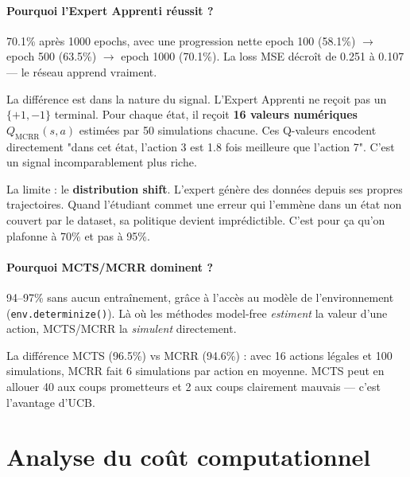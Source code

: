 \documentclass[12pt,a4paper]{article}
\begin{document}
\paragraph{Pourquoi l'Expert Apprenti réussit ?}

70.1\% après 1000 epochs, avec une progression nette epoch 100 (58.1\%) $\to$ epoch 500 (63.5\%) $\to$ epoch 1000 (70.1\%). La loss MSE décroît de 0.251 à 0.107 — le réseau apprend vraiment.

La différence est dans la nature du signal. L'Expert Apprenti ne reçoit pas un $\{+1, -1\}$ terminal. Pour chaque état, il reçoit \textbf{16 valeurs numériques} $Q_\text{MCRR}(s, a)$ estimées par 50 simulations chacune. Ces Q-valeurs encodent directement "dans cet état, l'action 3 est 1.8 fois meilleure que l'action 7". C'est un signal incomparablement plus riche.

La limite : le \textbf{distribution shift}. L'expert génère des données depuis ses propres trajectoires. Quand l'étudiant commet une erreur qui l'emmène dans un état non couvert par le dataset, sa politique devient imprédictible. C'est pour ça qu'on plafonne à 70\% et pas à 95\%.

\paragraph{Pourquoi MCTS/MCRR dominent ?}

94--97\% sans aucun entraînement, grâce à l'accès au modèle de l'environnement (\texttt{env.determinize()}). Là où les méthodes model-free \emph{estiment} la valeur d'une action, MCTS/MCRR la \emph{simulent} directement.

La différence MCTS (96.5\%) vs MCRR (94.6\%) : avec 16 actions légales et 100 simulations, MCRR fait 6 simulations par action en moyenne. MCTS peut en allouer 40 aux coups prometteurs et 2 aux coups clairement mauvais — c'est l'avantage d'UCB.

\section{Analyse du coût computationnel}
\end{document}
